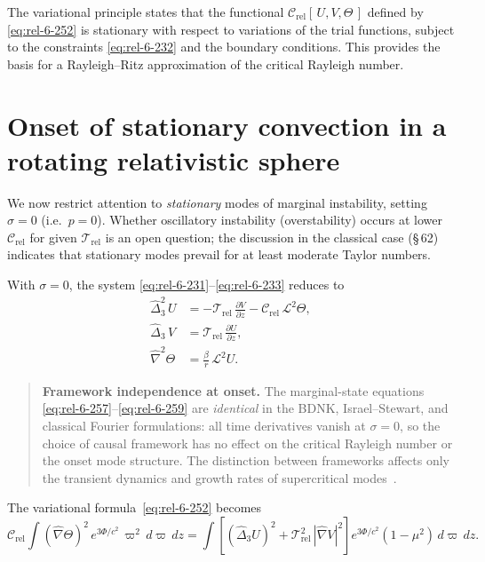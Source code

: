 The variational principle states that the functional
$\mathcal{C}_{\mathrm{rel}}[\,U,V,\Theta\,]$ defined by
\eqref{eq:rel-6-252} is stationary with respect to variations of
the trial functions, subject to the constraints
\eqref{eq:rel-6-232} and the boundary conditions.  This provides
the basis for a Rayleigh--Ritz approximation of the critical
Rayleigh number.

\section{Onset of stationary convection in a rotating relativistic
  sphere}\label{sec:rel-62}

We now restrict attention to \emph{stationary} modes of marginal
instability, setting $\sigma = 0$ (i.e.\ $p = 0$).  Whether
oscillatory instability (overstability) occurs at lower
$\mathcal{C}_{\mathrm{rel}}$ for given
$\mathscr{T}_{\mathrm{rel}}$ is an open question; the discussion
in the classical case (\S\,62) indicates that stationary modes
prevail for at least moderate Taylor numbers.

With $\sigma = 0$, the system
\eqref{eq:rel-6-231}--\eqref{eq:rel-6-233} reduces to
\begin{align}
  \hat{\Delta}_{3}^{2}\,U
  &= -\mathscr{T}_{\mathrm{rel}}\,
     \frac{\partial V}{\partial z}
     - \mathcal{C}_{\mathrm{rel}}\,\mathscr{L}^{2}\Theta,
  \label{eq:rel-6-257}\\[4pt]
  \hat{\Delta}_{3}\,V
  &= \mathscr{T}_{\mathrm{rel}}\,
     \frac{\partial U}{\partial z},
  \label{eq:rel-6-258}\\[4pt]
  \hat{\nabla}^{2}\Theta
  &= \frac{\beta}{r}\,\mathscr{L}^{2}U.
  \label{eq:rel-6-259}
\end{align}

\begin{quote}
\textbf{Framework independence at onset.}
The marginal-state equations
\eqref{eq:rel-6-257}--\eqref{eq:rel-6-259} are \emph{identical} in
the BDNK, Israel--Stewart, and classical Fourier formulations: all
time derivatives vanish at $\sigma = 0$, so the choice of causal
framework has no effect on the critical Rayleigh number or the
onset mode structure.  The distinction between frameworks affects
only the transient dynamics and growth rates of supercritical
modes~\cite{BemficaDN2018,Kovtun2019}.
\end{quote}

The variational formula~\eqref{eq:rel-6-252} becomes
\begin{equation}\label{eq:rel-6-260}
  \mathcal{C}_{\mathrm{rel}}
  \int(\hat{\nabla}\Theta)^{2}\,
    e^{3\Phi/c^{2}}\,\varpi^{2}\,d\varpi\,dz
  = \int\!\left[
    (\hat{\Delta}_{3}U)^{2}
    + \mathscr{T}_{\mathrm{rel}}^{2}\,|\hat{\nabla}V|^{2}
  \right]
  e^{3\Phi/c^{2}}(1-\mu^{2})\,d\varpi\,dz.
\end{equation}


